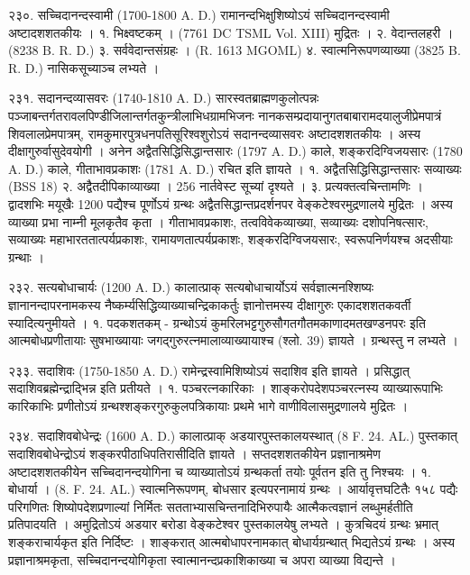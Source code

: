 २३०. सच्चिदानन्दस्वामी (1700-1800 A. D.)
रामानन्दभिक्षुशिष्योऽयं सच्चिदानन्दस्वामी अष्टादशशतकीयः । 
१. भिक्ष्वष्टकम् । (7761 DC TSML Vol. XIII) मुद्रितः ।
२. वेदान्तलहरी । (8238 B. R. D.)
३. सर्ववेदान्तसंग्रहः । (R. 1613 MGOML)
४. स्वात्मनिरूपणव्याख्या (3825 B. R. D.) नासिकसूच्याञ्च लभ्यते ।

२३१. सदानन्दव्यासवरः (1740-1810 A. D.)
सारस्वतब्राह्मणकुलोत्पन्नः पञ्जाबन्तर्गतरावलपिण्डीजिलान्तर्गतकुन्त्रीलाभिधग्रामभिजनः नानकसम्प्रदायानुगतबाबारामदयालुजीप्रेमपात्रं शिवलालप्रेमपात्रम्, रामकुमारपुत्रधनपतिसूरिश्वशुरोऽयं सदानन्दव्यासवरः अष्टादशशतकीयः । अस्य दीक्षागुरुर्वासुदेवयोगी । अनेन अद्वैतसिद्धिसिद्धान्तसारः (1797 A. D.) काले, शङ्करदिग्विजयसारः (1780 A. D.) काले, गीताभावप्रकाशः (1781 A. D.) रचित इति ज्ञायते ।
१. अद्वैतसिद्धिसिद्धान्तसारः सव्याख्यः (BSS 18)
२. अद्वैतदीपिकाव्याख्या । 256 नार्तवेस्ट सूच्यां दृश्यते । 
३. प्रत्यक्तत्वचिन्तामणिः ।
द्वादशभिः मयूखैः 1200 पद्यैश्च पूर्णोऽयं ग्रन्थः अद्वैतसिद्धान्तप्रदर्शनपर वेङ्कटेश्वरमुद्रणालये मुद्रितः । अस्य व्याख्या प्रभा नाम्नी मूलकृतैव कृता ।
गीताभावप्रकाशः, तत्वविवेकव्याख्या, सव्याख्यः दशोपनिषत्सारः, सव्याख्यः महाभारततात्पर्यप्रकाशः, रामायणतात्पर्यप्रकाशः, शङ्करदिग्विजयसारः, स्वरूपनिर्णयश्च अदसीयाः ग्रन्थाः ।

२३२. सत्यबोधाचार्यः (1200 A. D.) कालात्प्राक्
सत्यबोधाचार्योऽयं सर्वज्ञात्मनश्शिष्यः ज्ञानानन्दापरनामकस्य नैष्कर्म्यसिद्धिव्याख्याचन्द्रिकाकर्तुः ज्ञानोत्तमस्य दीक्षागुरुः एकादशशतकवर्ती स्यादित्यनुमीयते ।
१. पदकशतकम् -
ग्रन्थोऽयं कुमरिलभट्टगुरुसौगतगौतमकाणादमतखण्डनपरः इति आत्मबोधप्रणीतायाः सुषभाख्यायाः जगद्गुरुरत्नमालाव्याख्यायाश्च (श्लो. 39) ज्ञायते । ग्रन्थस्तु न लभ्यते ।

२३३. सदाशिवः (1750-1850 A. D.)
रामेन्द्रस्वामिशिष्योऽयं सदाशिव इति ज्ञायते । प्रसिद्धात् सदाशिवब्रह्मेन्द्राद्भिन्न इति प्रतीयते ।
१. पञ्चरत्नकारिकाः । शाङ्करोपदेशपञ्चरत्नस्य व्याख्यारूपाभिः कारिकाभिः प्रणीतोऽयं ग्रन्थश्शङ्करगुरुकुलपत्रिकायाः प्रथमे भागे वाणीविलासमुद्रणालये मुद्रितः ।

२३४. सदाशिवबोधेन्द्रः (1600 A. D.) कालात्प्राक्
अडयारपुस्तकालयस्थात् (8 F. 24. AL.) पुस्तकात् सदाशिवबोधेन्द्रोऽयं शङ्करपीठाधिपतिरासीदिति ज्ञायते । सप्तदशशतकीयेन प्रज्ञानाश्रमेण अष्टादशशतकीयेन सच्चिदानन्दयोगिना च व्याख्यातोऽयं ग्रन्थकर्ता तयोः पूर्वतन इति तु निश्चयः ।
१. बोधार्या । (8. F. 24. AL.)
स्वात्मनिरूपणम्, बोधसार इत्यपरनामायं ग्रन्थः । आर्यावृत्तघटितैः १५८ पद्यैः परिगणितः शिष्योपदेशप्रणाल्यां निर्मितः सतताभ्यासचिन्तनादिभिरुपायैः आत्मैकत्वज्ञानं लब्धुमर्हतीति प्रतिपादयति । अमुद्रितोऽयं अडयार बरोडा वेङ्कटेश्वर पुस्तकालयेषु लभ्यते । कुत्रचिदयं ग्रन्थः भ्रमात् शङ्कराचार्यकृत इति निर्दिष्टः । शाङ्करात् आत्मबोधापरनामकात् बोधार्यग्रन्थात् भिद्यतेऽयं ग्रन्थः । अस्य प्रज्ञानाश्रमकृता, सच्चिदानन्दयोगिकृता स्वात्मानन्दप्रकाशिकाख्या च अपरा व्याख्या विद्यन्ते ।


